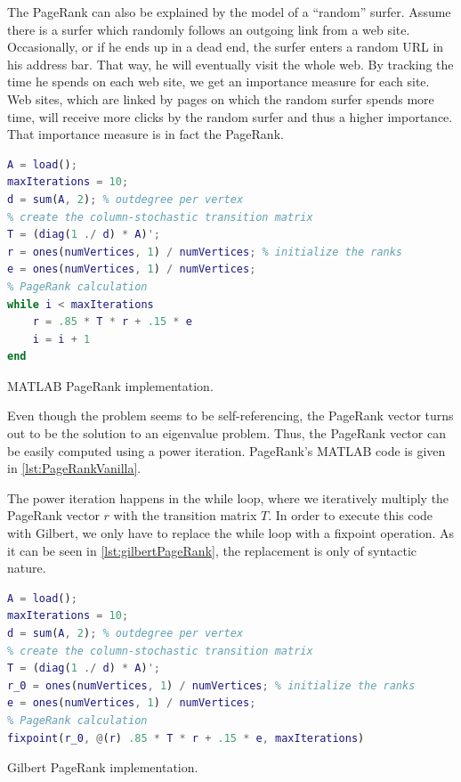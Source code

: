 The PageRank can also be explained by the model of a ``random'' surfer.
Assume there is a surfer which randomly follows an outgoing link from a web site.
Occasionally, or if he ends up in a dead end, the surfer enters a random URL in his address bar.
That way, he will eventually visit the whole web.
By tracking the time he spends on each web site, we get an importance measure for each site.
Web sites, which are linked by pages on which the random surfer spends more time, will receive more clicks by the random surfer and thus a higher importance.
That importance measure is in fact the PageRank.

\begin{listing}[!h]
	\begin{CenteredBox}
		\begin{lstlisting}[language=Matlab,
		commentstyle=\color{black},
		  stringstyle=\color{black},
		  keywordstyle=\color{black}\bfseries,
		  morekeywords={ones},]
% load adjacency matrix
A = load(); 
maxIterations = 10;
d = sum(A, 2); % outdegree per vertex
% create the column-stochastic transition matrix
T = (diag(1 ./ d) * A)'; 
r = ones(numVertices, 1) / numVertices; % initialize the ranks
e = ones(numVertices, 1) / numVertices;
% PageRank calculation
while i < maxIterations
	r = .85 * T * r + .15 * e
	i = i + 1
end
		\end{lstlisting}
	\end{CenteredBox}
	\caption{MATLAB PageRank implementation.}
	\label{lst:PageRankVanilla}
\end{listing}

Even though the problem seems to be self-referencing, the PageRank vector turns out to be the solution to an eigenvalue problem.
Thus, the PageRank vector can be easily computed using a power iteration.
PageRank's MATLAB code is given in \cref{lst:PageRankVanilla}.

The power iteration happens in the while loop, where we iteratively multiply the PageRank vector $r$ with the transition matrix $T$.
In order to execute this code with Gilbert, we only have to replace the while loop with a fixpoint operation.
As it can be seen in \cref{lst:gilbertPageRank}, the replacement is only of syntactic nature.

\begin{listing}[!h]
	\begin{CenteredBox}
		\begin{lstlisting}[language=Matlab,
		commentstyle=\color{black},
		  stringstyle=\color{black},
		  keywordstyle=\color{black}\bfseries,
		  morekeywords={ones, fixpoint},]
% load adjacency matrix
A = load();
maxIterations = 10;
d = sum(A, 2); % outdegree per vertex
% create the column-stochastic transition matrix
T = (diag(1 ./ d) * A)'; 
r_0 = ones(numVertices, 1) / numVertices; % initialize the ranks
e = ones(numVertices, 1) / numVertices;
% PageRank calculation
fixpoint(r_0, @(r) .85 * T * r + .15 * e, maxIterations)
		\end{lstlisting}
	\end{CenteredBox}
	\caption{Gilbert PageRank implementation.}
	\label{lst:gilbertPageRank}
\end{listing}

